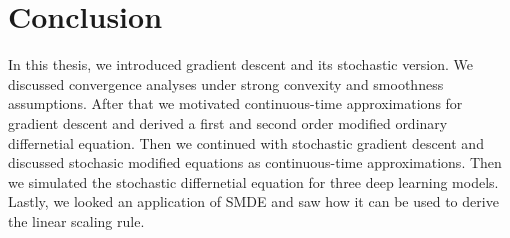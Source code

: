 \documentclass[12pt]{article}
\theoremstyle{definition}
\numberwithin{equation}{section}
\begin{document}
\section{Conclusion}

In this thesis, we introduced gradient descent and its stochastic version. We discussed convergence analyses under strong convexity and smoothness assumptions. After that we motivated continuous-time approximations for gradient descent and derived a first and second order modified ordinary differnetial equation. Then we continued with stochastic gradient descent and discussed stochasic modified equations as continuous-time approximations. Then we simulated the stochastic differnetial equation for three deep learning models. Lastly, we looked an application of SMDE and saw how it can be used to derive the linear scaling rule.



\printbibliography

\appendix
\end{document}
